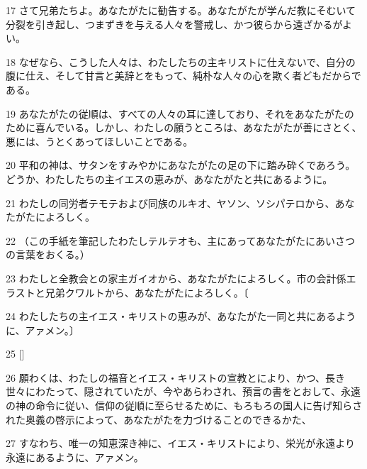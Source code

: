 \par 17 さて兄弟たちよ。あなたがたに勧告する。あなたがたが学んだ教にそむいて分裂を引き起し、つまずきを与える人々を警戒し、かつ彼らから遠ざかるがよい。
\par 18 なぜなら、こうした人々は、わたしたちの主キリストに仕えないで、自分の腹に仕え、そして甘言と美辞とをもって、純朴な人々の心を欺く者どもだからである。
\par 19 あなたがたの従順は、すべての人々の耳に達しており、それをあなたがたのために喜んでいる。しかし、わたしの願うところは、あなたがたが善にさとく、悪には、うとくあってほしいことである。
\par 20 平和の神は、サタンをすみやかにあなたがたの足の下に踏み砕くであろう。どうか、わたしたちの主イエスの恵みが、あなたがたと共にあるように。
\par 21 わたしの同労者テモテおよび同族のルキオ、ヤソン、ソシパテロから、あなたがたによろしく。
\par 22 （この手紙を筆記したわたしテルテオも、主にあってあなたがたにあいさつの言葉をおくる。）
\par 23 わたしと全教会との家主ガイオから、あなたがたによろしく。市の会計係エラストと兄弟クワルトから、あなたがたによろしく。〔
\par 24 わたしたちの主イエス・キリストの恵みが、あなたがた一同と共にあるように、アァメン。〕
\par 25 []
\par 26 願わくは、わたしの福音とイエス・キリストの宣教とにより、かつ、長き世々にわたって、隠されていたが、今やあらわされ、預言の書をとおして、永遠の神の命令に従い、信仰の従順に至らせるために、もろもろの国人に告げ知らされた奥義の啓示によって、あなたがたを力づけることのできるかた、
\par 27 すなわち、唯一の知恵深き神に、イエス・キリストにより、栄光が永遠より永遠にあるように、アァメン。


